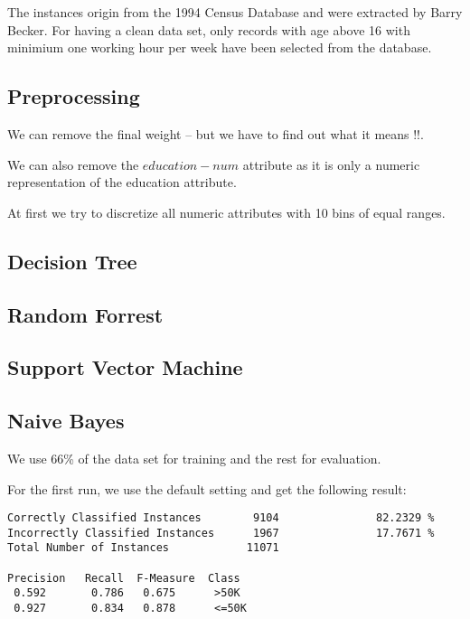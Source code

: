 \documentclass[paper=a4, fontsize=11pt]{scrartcl} %
\numberwithin{equation}{section} %
\numberwithin{figure}{section} %
\numberwithin{table}{section} %
\begin{document}
The instances origin from the 1994 Census Database and were extracted by Barry Becker. For having a clean data set, only records with age above 16 with minimium one working hour per week have been selected from the database.

\subsection{Preprocessing}

We can remove the final weight -- but we have to find out what it means !!.

We can also remove the $education-num$ attribute as it is only a numeric representation of the education attribute.

At first we try to discretize all numeric attributes with 10 bins of equal ranges.




\subsection{Decision Tree}




\subsection{Random Forrest}




\subsection{Support Vector Machine}




\subsection{Naive Bayes}

We use 66\% of the data set for training and the rest for evaluation.

For the first run, we use the default setting and get the following result:

\begin{verbatim}
Correctly Classified Instances        9104               82.2329 %
Incorrectly Classified Instances      1967               17.7671 %
Total Number of Instances            11071     

Precision   Recall  F-Measure  Class
 0.592       0.786   0.675      >50K
 0.927       0.834   0.878      <=50K
\end{verbatim}
\end{document}

